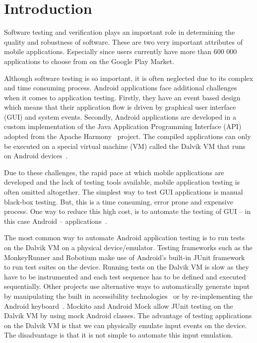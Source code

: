 \documentclass{acm_proc_article-sp}
\begin{document}


\section{Introduction}
Software testing and verification plays an important role in determining the quality and robustness of software. These are two very
important attributes of mobile applications. Especially since users currently have more than 600 000 applications to choose from on the
Google Play Market.

Although software testing is so important, it is often neglected due to its complex and time consuming process. Android
applications face additional challenges when it comes to application testing. Firstly, they have an event based design which means that
their application flow is driven by graphical user interface (GUI) and system events. Secondly, Android applications are developed in a
custom implementation of the Java Application Programming Interface (API)  adopted from the Apache Harmony~\cite{harmony} project. The
compiled applications can only be executed on a special virtual machine (VM) called the Dalvik VM that runs on Android
devices~\cite{dalvik}.

Due to these challenges, the rapid pace at which mobile applications are developed and the lack of testing tools available, mobile
application testing is often omitted altogether. The simplest way to test GUI applications is manual black-box testing.
But, this is a time consuming, error prone and expensive~\cite{AccessibilityTech} process. One way to reduce this high cost, is to  automate
the testing of GUI -- in this case Android -- applications~\cite{AccessibilityTech}.

The most common way to automate Android application testing is to run tests on the Dalvik VM on a
physical device/emulator. Testing frameworks such as the MonkeyRunner and Robotium make use of Android's built-in JUnit
framework~\cite{TestingAndroid} to run test suites on the device. Running tests on the Dalvik VM is slow as they have to be instrumented and
each test sequence has to be defined and executed sequentially. Other projects use alternative ways to automatically generate input by
manipulating the built in accessibility technologies~\cite{AccessibilityTech} or by re-implementing the Android
keyboard~\cite{KeyboardModel}. Mockito and Android Mock allow JUnit testing on the Dalvik VM by using mock Android classes. The advantage of
testing applications on the Dalvik VM is that we can physically emulate input events on the device. The disadvantage is that it is not
simple to automate this input emulation. 
\end{document}
